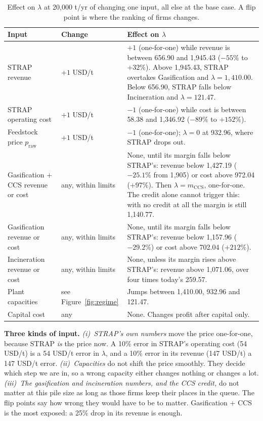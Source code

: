 \documentclass[11pt]{article}
\newcommand{\usd}{USD}
\newcommand{\ccs}{\mathrm{CCS}}
\begin{document}
\begin{table}[h]
\centering
\caption{Effect on $\lambda$ at 20{,}000 t/yr of changing one input, all else at the
base case. A flip point is where the ranking of firms changes.}
\label{tab:sens}
\small
\renewcommand{\arraystretch}{1.2}
\begin{tabular}{@{}>{\raggedright\arraybackslash}p{3.7cm}>{\raggedright\arraybackslash}p{2.6cm}>{\raggedright\arraybackslash}p{8.6cm}@{}}
\toprule
\textbf{Input} & \textbf{Change} & \textbf{Effect on $\lambda$} \\
\midrule
STRAP revenue & $+1$ \usd/t & $+1$ (one-for-one) while revenue is between 656.90 and 1{,}945.43 ($-55\%$ to $+32\%$). Above 1{,}945.43, STRAP overtakes Gasification and $\lambda=1{,}410.00$. Below 656.90, STRAP falls below Incineration and $\lambda=121.47$. \\
STRAP operating cost & $+1$ \usd/t & $-1$ (one-for-one) while cost is between 58.38 and 1{,}346.92 ($-89\%$ to $+152\%$). \\
Feedstock price $p_{\mathrm{raw}}$ & $+1$ \usd/t & $-1$ (one-for-one); $\lambda=0$ at 932.96, where STRAP drops out. \\
Gasification + CCS revenue or cost & any, within limits & None, until its margin falls below STRAP's: revenue below 1{,}427.19 ($-25.1\%$ from 1{,}905) or cost above 972.04 ($+97\%$). Then $\lambda=m_\ccs$, one-for-one. The credit alone cannot trigger this: with no credit at all the margin is still 1{,}140.77. \\
Gasification revenue or cost & any, within limits & None, until its margin falls below STRAP's: revenue below 1{,}157.96 ($-29.2\%$) or cost above 702.04 ($+212\%$). \\
Incineration revenue or cost & any, within limits & None, unless its margin rises above STRAP's: revenue above 1{,}071.06, over four times today's 259.57. \\
Plant capacities & see Figure~\ref{fig:regime} & Jumps between 1{,}410.00, 932.96 and 121.47. \\
Capital cost & any & None. Changes profit after capital only. \\
\bottomrule
\end{tabular}
\end{table}

\begin{readbox}
\textbf{Three kinds of input.}
\emph{(i)~STRAP's own numbers} move the price one-for-one, because STRAP \emph{is} the
price now. A 10\% error in STRAP's operating cost (54 \usd/t) is a 54 \usd/t error in
$\lambda$, and a 10\% error in its revenue (147 \usd/t) a 147 \usd/t error.
\emph{(ii)~Capacities} do not shift the price smoothly. They decide which step we are
in, so a wrong capacity either changes nothing or changes a lot.
\emph{(iii)~The gasification and incineration numbers, and the CCS credit,} do not
matter at this pile size as long as those firms keep their places in the queue. The
flip points say how wrong they would have to be to matter. Gasification + CCS is the
most exposed: a 25\% drop in its revenue is enough.
\end{readbox}
\end{document}
